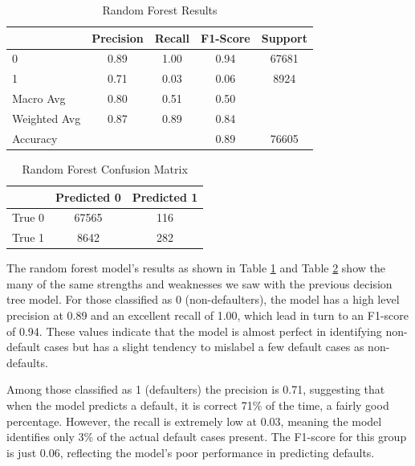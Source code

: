 \documentclass[12pt]{article}
\begin{document}
\begin{table}[htbp]
    \centering
    \caption{Random Forest Results}
    \begin{tabular}{lcccc}
        \toprule
        & Precision & Recall & F1-Score & Support \\
        \midrule
        0 & 0.89 & 1.00 & 0.94 & 67681 \\
        1 & 0.71 & 0.03 & 0.06 & 8924 \\
        Macro Avg & 0.80 & 0.51 & 0.50 & \\
        Weighted Avg & 0.87 & 0.89 & 0.84 & \\
        \midrule
        Accuracy & & & 0.89 & 76605 \\
        \bottomrule
    \end{tabular}
    \label{table:randomForestResults}
\end{table}

\begin{table}[htbp]
    \centering
    \caption{Random Forest Confusion Matrix}
    \begin{tabular}{lcc}
        \toprule
        & Predicted 0 & Predicted 1 \\
        \midrule
        True 0 & 67565 & 116 \\
        True 1 & 8642 & 282 \\
        \bottomrule
    \end{tabular}
    \label{table:randomForestConfusionMatrix}
\end{table}

The random forest model's results as shown in Table \ref{table:randomForestResults} and Table \ref{table:randomForestConfusionMatrix} show the many of the same strengths and weaknesses we saw with the previous decision tree model. For those classified as 0 (non-defaulters), the model has a high level precision at 0.89 and an excellent recall of 1.00, which lead in turn to an F1-score of 0.94. These values indicate that the model is almost perfect in identifying non-default cases but has a slight tendency to mislabel a few default cases as non-defaults.

Among those classified as 1 (defaulters) the precision is 0.71, suggesting that when the model predicts a default, it is correct 71\% of the time, a fairly good percentage. However, the recall is extremely low at 0.03, meaning the model identifies only 3\% of the actual default cases present. The F1-score for this group is just 0.06, reflecting the model's poor performance in predicting defaults.
\end{document}
